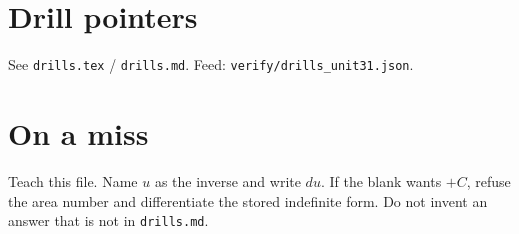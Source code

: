 \section{Drill pointers}
See \texttt{drills.tex} / \texttt{drills.md}. Feed: \texttt{verify/drills\_unit31.json}.

\section*{On a miss}
Teach this file. Name $u$ as the inverse and write $du$. If the blank wants $+C$, refuse the area number and differentiate the stored indefinite form. Do not invent an answer that is not in \texttt{drills.md}.

